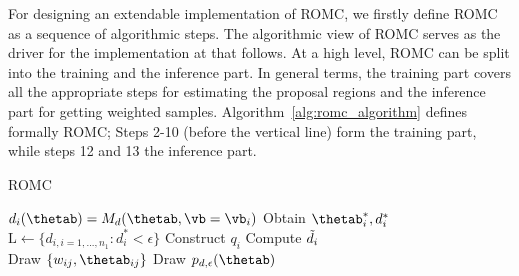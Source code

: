 For designing an extendable implementation of ROMC, we firstly define
ROMC as a sequence of algorithmic steps. The algorithmic view of ROMC
serves as the driver for the implementation at  that
follows. At a high level, ROMC can be split into the training and the
inference part. In general terms, the training part covers all the
appropriate steps for estimating the proposal regions and the
inference part for getting weighted
samples. Algorithm~\ref{alg:romc_algorithm} defines formally ROMC;
Steps 2-10 (before the vertical line) form the training part, while
steps 12 and 13 the inference part.

\begin{algorithm}[!ht]
	\caption{ROMC}\label{alg:romc_algorithm}
	\begin{algorithmic}[1]
      \State $d_i(\thetab) = M_d(\thetab, \vb=\vb_i)$ 
      \State Obtain $\thetab_i^*, d_i^*$ 
    \EndFor
    \State $\text{L} \gets \{d_{i, i = 1, ..., n_1}: d_i^* < \epsilon \} $ 
      \State Construct $q_i$ 
      \State Compute $\Tilde{d}_i$ 
      \EndFor
    \\\hrulefill
    \State Draw $\{w_{ij}, \thetab_{ij}\}$ 
    \State Draw $p_{d,\epsilon}(\thetab)$     
    \EndProcedure
	\end{algorithmic}
\end{algorithm}

